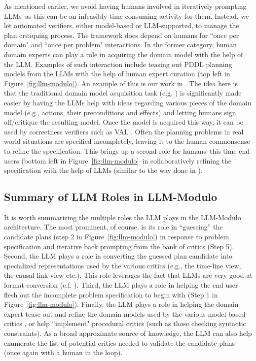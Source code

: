 \documentclass{article}
\newcommand{\bnote}[1]{\color{black}#1\color{black}}
\theoremstyle{plain}
\theoremstyle{definition}
\theoremstyle{remark}
\begin{document}
As mentioned earlier, we avoid having humans involved in iteratively prompting LLMs--as this can be an infeasibly time-consuming activity for them. Instead, we let automated verifiers, either model-based or LLM-supported, to manage the plan critiquing process. 
%
The framework does depend on humans for ``once per domain" and ``once
per problem" interactions. In the former category, human domain experts
can play a role in acquiring the domain model with the help of the
LLM. Examples of such interaction include teasing out PDDL planning
models from the LLMs with the help of human expert curation (top left in
Figure~\ref{fig:llm-modulo}). An example of this is our work in 
\cite{guan2023leveraging}. The idea here is that the traditional domain model acquisition task (e.g. \cite{simpson2001gipo}) is significantly made easier by having the LLMs help with ideas regarding various pieces of the domain model (e.g., actions, their preconditions and effects) and letting humans sign off/critique the resulting model. Once the model is acquired this way, it can be used by correctness verifiers such as VAL \cite{howey2004val,guan2023leveraging}.
%
Often the planning problems in real world situations are specified
incompletely, leaving it to the human commonsense to refine the
specification. This brings up a second role for humans--this time end
users (bottom left in Figure~\ref{fig:llm-modulo}--in collaboratively
refining the specification with the help of LLMs (similar to the way
done in  \cite{xie2023translating,liu2023llm+}).


\subsection{Summary of LLM Roles in LLM-Modulo}
It is worth summarizing the  multiple roles the LLM plays in the LLM-Modulo architecture. The most prominent, of course, is its role in ``guessing'' the candidate plans (step 2 in Figure~\ref{fig:llm-modulo}) in response to problem specification and iterative back prompting from the bank of critics (Step 5). 
%
Second, the LLM plays a role in converting the guessed plan candidate into specialized representations used by the various critics (e.g., the time-line view, the causal link view etc.). This role leverages the fact that LLMs are very good at format conversion (c.f. \cite{olmo2021gpt3}). 
%
Third, the LLM plays a role in helping the end user flesh out the incomplete problem specification to begin with (Step 1 in Figure~\ref{fig:llm-modulo}). 
%
Finally, the LLM plays a role in helping the domain expert tease out and refine the domain models used by the various model-based critics \cite{guan2023leveraging,kwon2022reward}, or help ``implement" procedural critics (such as those checking syntactic constraints). \bnote{As a broad approximate source of knowledge,  the LLM can also help enumerate the list of potential critics needed to validate the candidate plans (once again with a human in the loop).}
\end{document}
